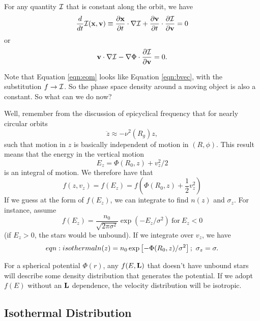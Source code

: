 \documentclass[]{article}
\begin{document}
For any quantity $\mathcal{I}$ that is constant along the orbit, we have
\begin{equation}
\label{eqn:eom}
\frac{d}{dt}\mathcal{I}(\mathbf{x},\mathbf{v}) \equiv \frac{\partial \mathbf{x}}{\partial t} \cdot \nabla \mathcal{I} + \frac{\partial \mathbf{v}}{\partial t} \cdot \frac{\partial \mathcal{I}}{\partial \mathbf{v}} = 0
\end{equation}
\noindent
or\begin{equation}
\mathbf{v} \cdot \nabla \mathcal{I} - \nabla \Phi \cdot \frac{\partial \mathcal{I}}{\partial \mathbf{v}} = 0.
\end{equation}

Note that Equation \ref{eqn:eom} looks like Equation \ref{eqn:bvec}, with the substitution
$f\to\mathcal{I}$. So the phase space density around a moving object is also a constant.
So what can we do now?

Well, remember from the discussion of epicyclical frequency that for nearly circular orbits
\begin{equation}
\ddot{z} \approx - \nu^2(R_g)z,
\end{equation}
\noindent
such that motion in $z$ is basically independent of motion in $(R,\phi)$. This result
means that the energy in the vertical motion
\begin{equation}
E_z = \Phi(R_0,z) + v_z^2/2
\end{equation}
\noindent
is an integral of motion. We therefore have that
\begin{equation}
f(z,v_z) = f(E_z) = f\left(\Phi(R_0,z) + \frac{1}{2}v_z^2\right)
\end{equation}
\noindent
If we guess at the form of $f(E_z)$, we can integrate to find $n(z)$ and $\sigma_z$.
For instance, assume
\begin{equation}
f(E_z) = \frac{n_0}{\sqrt{2\pi\sigma^2}}\exp(-E_z/\sigma^2)~\mathrm{for}~E_z<0
\end{equation}
(if $E_z>0$, the stars would be unbound).  If we integrate over $v_z$, we have
\begin{equation}
\noindent{eqn:isothermal}
n(z) = n_0 \exp\left[-\Phi(R_0,z)/\sigma^2\right];~\sigma_z = \sigma.
\end{equation}

For a spherical potential $\Phi(r)$, any $f(E,\mathbf{L})$ that doesn't have unbound stars will
describe some density distribution that generates the potential.  If we adopt $f(E)$ without
an $\mathbf{L}$ dependence, the velocity distribution will be isotropic.

\subsection{Isothermal Distribution}
\end{document}
